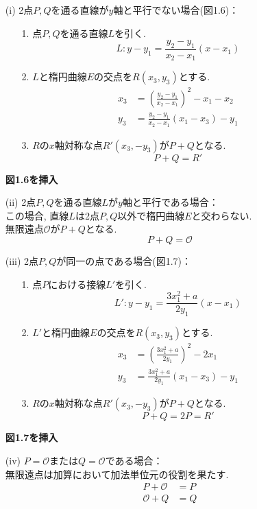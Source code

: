 \begin{enumerate}
  \item[(i)　] 2点$P,Q$を通る直線が$y$軸と平行でない場合(図1.6)：
  \begin{enumerate}
    \item[1.　] 点$P,Q$を通る直線$L$を引く.
    \[
      L : y-y_1 = \frac{y_2-y_1}{x_2-x_1}(x-x_1)
    \]
    \item[2.　] $L$と楕円曲線$E$の交点を$R(x_3,y_3)$とする.
    \[
    \begin{aligned}
      x_3 &= \left(\frac{y_2-y_1}{x_2-x_1}\right)^2-x_1-x_2\\
      y_3 &= \frac{y_2-y_1}{x_2-x_1}(x_1-x_3)-y_1
    \end{aligned}
    \]
    \item[3.　] $R$の$x$軸対称な点$R'(x_3,-y_3)$が$P+Q$となる.
    \[
      P+Q=R'
    \]
  \end{enumerate}
  {\LARGE\textbf{図1.6を挿入}}\\
  \item[(ii)　] 2点$P,Q$を通る直線$L$が$y$軸と平行である場合：\\
  \indent この場合, 直線$L$は2点$P,Q$以外で楕円曲線$E$と交わらない.\\ 
  \indent 無限遠点$\mathcal{O}$が$P+Q$となる.
  \[
    P+Q=\mathcal{O}
  \]
  \item[(iii)　] 2点$P,Q$が同一の点である場合(図1.7)：\\
  \begin{enumerate}
    \item[1.　] 点$P$における接線$L'$を引く. 
    \[
      L' : y-y_1 = \frac{3x_1^2 + a}{2y_1}(x - x_1)
    \] 
    \item[2.　] $L'$と楕円曲線$E$の交点を$R(x_3,y_3)$とする.
    \[
    \begin{aligned}
      x_3 &= \left(\frac{3x_1^2 + a}{2y_1}\right)^2-2x_1\\
      y_3 &= \frac{3x_1^2 + a}{2y_1}(x_1-x_3)-y_1
    \end{aligned}
    \]
    \item[3.　] $R$の$x$軸対称な点$R'(x_3,-y_3)$が$P+Q$となる.
    \[
      P+Q=2P=R'
    \]
  \end{enumerate}
  {\Huge\textbf{図1.7を挿入}}
  \item[(iv)　] $P=\mathcal{O}$または$Q=\mathcal{O}$である場合：\\
  \indent 無限遠点は加算において加法単位元の役割を果たす.
  \[
  \begin{aligned}
    P+\mathcal{O}&=P\\
    \mathcal{O}+Q&=Q
  \end{aligned}
  \]    
\end{enumerate}
